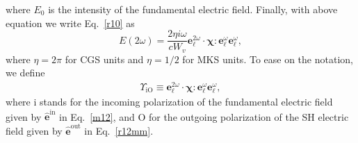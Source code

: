 where $E_{0}$ is the intensity of the fundamental electric field.
Finally, with above equation we write Eq.~\eqref{r10} as
\begin{equation}\label{mr10}
E(2\omega) 
= \frac{2\eta i \omega}{cW_v}
\mathbf{e}^{2\omega}_{\ell}\cdot\boldsymbol{\chi}:\mathbf{e}^{\omega}_{\ell}
\mathbf{e}^{\omega}_{\ell}
,
\end{equation}
where $\eta=2\pi$ for CGS units and $\eta=1/2$ for MKS units.
To ease on the notation, we define
\begin{align}\label{mc0}
\Upsilon_{\mathrm{iO}}
\equiv 
\mathbf{e}^{2\omega}_{\ell}\cdot\boldsymbol{\chi}:\mathbf{e}^{\omega}_{\ell}
\mathbf{e}^{\omega}_{\ell}
,
\end{align}
where i stands for the incoming polarization of the fundamental
electric field given by $\hat{\mathbf{e}}^{\mathrm{in}}$ in Eq.~\eqref{m12},
and O for the outgoing polarization of the SH electric field
given by $\hat{\mathbf{e}}^{\mathrm{out}}$ in Eq.~\eqref{r12mm}.

